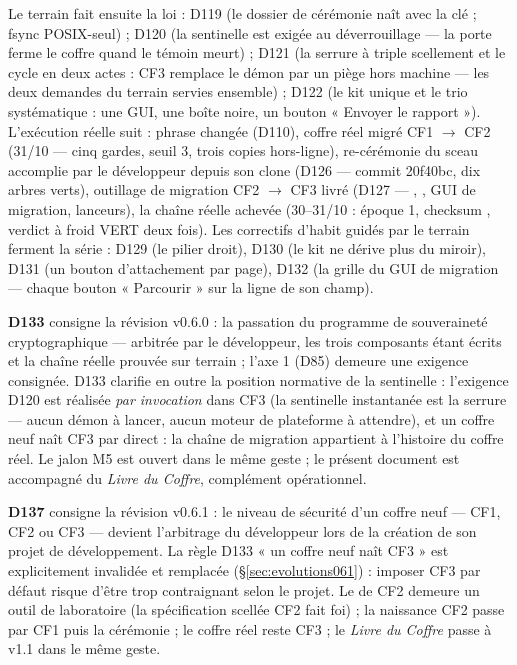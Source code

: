 Le terrain fait ensuite la loi : D119 (le dossier de cérémonie naît avec la clé ; fsync
POSIX-seul) ; D120 (la sentinelle est exigée au déverrouillage — la porte ferme le
coffre quand le témoin meurt) ; D121 (la serrure à triple scellement et le cycle en deux
actes : CF3 remplace le démon par un piège hors machine — les deux demandes du terrain
servies ensemble) ; D122 (le kit unique et le trio systématique : une GUI, une boîte
noire, un bouton « Envoyer le rapport »). L'exécution réelle suit : phrase changée
(D110), coffre réel migré CF1 $\to$ CF2 (31/10 — cinq gardes, seuil 3, trois copies
hors-ligne), re-cérémonie du sceau accomplie par le développeur depuis son clone
(D126 — commit 20f40bc, dix arbres verts), outillage de migration CF2 $\to$ CF3 livré
(D127 — , , GUI de migration, lanceurs), la chaîne
réelle achevée (30--31/10 : époque 1, checksum , verdict à froid VERT
deux fois). Les correctifs d'habit guidés par le terrain ferment la série : D129 (le
pilier droit), D130 (le kit ne dérive plus du miroir), D131 (un bouton d'attachement
par page), D132 (la grille du GUI de migration — chaque bouton « Parcourir » sur la
ligne de son champ).

\textbf{D133} consigne la révision v0.6.0 : la passation du programme de
souveraineté cryptographique — arbitrée par le développeur, les trois composants étant
écrits et la chaîne réelle prouvée sur terrain ; l'axe 1 (D85) demeure une exigence
consignée. D133 clarifie en outre la position normative de la sentinelle : l'exigence
D120 est réalisée \emph{par invocation} dans CF3 (la sentinelle instantanée est la
serrure — aucun démon à lancer, aucun moteur de plateforme à attendre), et un coffre
neuf naît CF3 par  direct : la chaîne de migration appartient à l'histoire du
coffre réel. Le jalon M5 est ouvert dans le même geste ; le présent document est
accompagné du \emph{Livre du Coffre}, complément opérationnel.

\textbf{D137} consigne la révision v0.6.1 : le niveau de sécurité d'un coffre neuf —
CF1, CF2 ou CF3 — devient l'arbitrage du développeur lors de la création de son projet
de développement. La règle D133 « un coffre neuf naît CF3 » est explicitement
invalidée et remplacée (§\ref{sec:evolutions061}) : imposer CF3 par défaut risque
d'être trop contraignant selon le projet. Le  de CF2 demeure un outil de
laboratoire (la spécification scellée CF2 fait foi) ; la naissance CF2 passe par
 CF1 puis la cérémonie  ; le coffre réel reste CF3 ; le
\emph{Livre du Coffre} passe à v1.1 dans le même geste.

